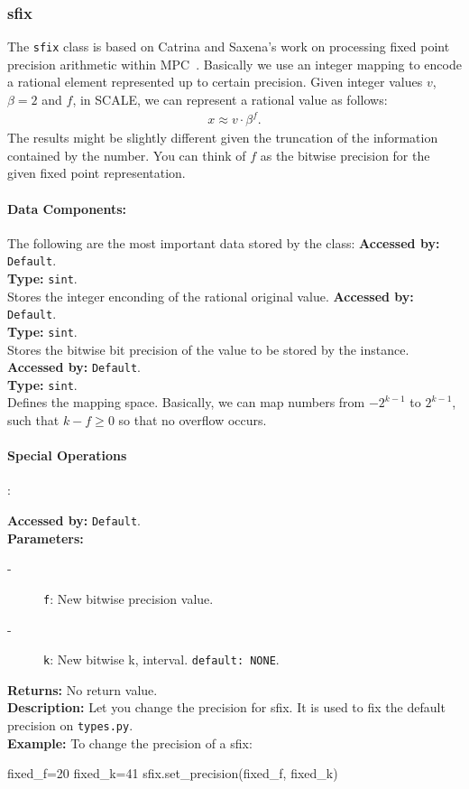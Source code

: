 \subsubsection{sfix}
	The \verb|sfix| class is based on Catrina and Saxena's work on processing fixed point precision arithmetic within MPC~\cite{CS10}. Basically we use an integer mapping to encode a rational element represented up to certain precision. 
Given integer values $v$, $\beta =2$ and $f$, in SCALE, we can represent a rational value as follows:
	\begin{align}
	  x \approx v \cdot \beta ^{f}.
	\end{align}
	The results might be slightly different given the truncation of the information contained by the number. You can think of $f$ as the bitwise precision for the given fixed point representation.
	\paragraph{Data Components:}
	The following are the most important data stored by the class:
	\textbf{Accessed by:} \verb|Default|.\\
	\textbf{Type:} \verb|sint|.\\
	Stores the integer enconding of the rational original value.
	\textbf{Accessed by:} \verb|Default|.\\
	\textbf{Type:} \verb|sint|.\\
	Stores the bitwise bit precision of the value to be stored by the instance.
	\textbf{Accessed by:} \verb|Default|.\\
	\textbf{Type:} \verb|sint|.\\
	Defines the mapping space. Basically, we can map numbers  from $-2^{k-1}$ to $2^{k-1}$, such that $k-f \geq 0$ so that no overflow occurs.
	
	
	\paragraph {Special Operations}:

			\textbf{Accessed by:} \verb|Default|.\\
    		\textbf{Parameters:}
     		\begin{description}
	     		\item[-] \verb|f|: New bitwise precision  value.
	    		\item[-] \verb|k|: New bitwise k, interval. \verb|default: NONE|.
    		\end{description}
    		\textbf{Returns:} No return value. \\
     		\textbf{Description:}
				Let you change the precision for sfix. It is used to fix the default precision on \verb|types.py|. \\
			\textbf{Example:}
				To change the precision of a sfix:
     			\begin{mylisting}
     			fixed_f=20
     			fixed_k=41
     			sfix.set_precision(fixed_f, fixed_k)
     			\end{mylisting}
     			
